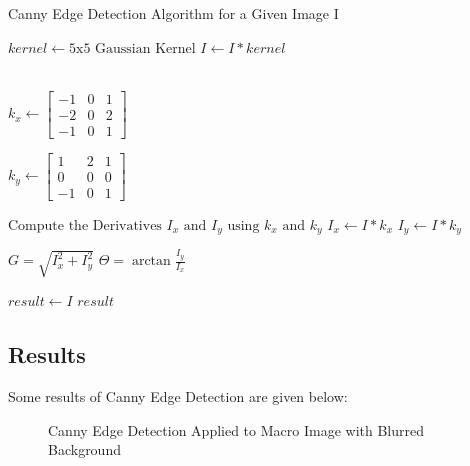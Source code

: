\documentclass{article}
\begin{document}
\begin{algorithm}
\caption{Canny Edge Detection Algorithm for a Given Image I}
    \begin{algorithmic}

    \STATE $kernel \leftarrow \text{5x5 Gaussian Kernel}$
    \STATE $I \gets I * kernel$
    
    \STATE {} \\
    \STATE $k_x \leftarrow \begin{bmatrix}
        -1 & 0 & 1 \\
        -2 & 0 & 2 \\
        -1 & 0 & 1 
    \end{bmatrix}$
    
    \STATE $k_y \leftarrow \begin{bmatrix}
        1 & 2 & 1 \\
        0 & 0 & 0 \\
        -1 & 0 & 1 
    \end{bmatrix}$
    
    \STATE $\text{Compute the Derivatives $I_x$ and $I_y$ using $k_x$ and $k_y$}$
    \STATE $I_x \leftarrow I * k_x$
    \STATE $I_y \leftarrow I * k_y$
    
    \STATE {}
    \STATE $G = \sqrt{I_x^2 + I_y^2}$
    \STATE $\Theta = \arctan{\frac{I_y}{I_x}}$
    
    \STATE {}
    
            \STATE {}
        \ENDFOR
    \ENDFOR
    
    \STATE $result \gets I$
    \RETURN $result$
    \end{algorithmic}
\end{algorithm}

\subsection{Results}

Some results of Canny Edge Detection are given below:


\begin{figure}[ht]
    \centering
    \qquad
    \caption{Canny Edge Detection Applied to Macro Image with Blurred Background}%
    \label{fig:canny-edge-detection-butterfly}%
\end{figure}
\end{document}
